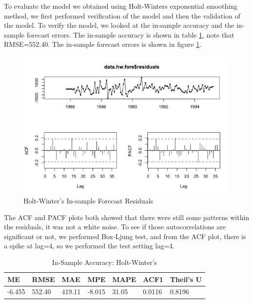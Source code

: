 \documentclass[journal, a4paper]{IEEEtran}
\begin{document}
To evaluate the model we obtained using Holt-Winters exponential smoothing method, we first performed verification of the model and then the validation of the model. 
To verify the model, we looked at the in-sample accuracy and the in-sample forecast errors. The in-sample accuracy is shown in table \ref{table:accuracy}, note that RMSE=552.40.
The in-sample forecast errors is shown in figure \ref{fig1:HW_forecast}.

\begin{figure}[H]
\begin{center}
\includegraphics[scale=0.35]{fig1/HW_forecast_tsdisplay.png}
\caption{Holt-Winter's In-sample Forecast Residuals}
\label{fig1:HW_forecast}
\end{center}
\end{figure}

The ACF and PACF plots both showed that there were still some patterns within the residuals, it was not a white noise.  To see if those autocorrelations are significant or not, we performed Box-Ljung test, and from the ACF plot, there is a spike at lag=4, so we performed the test setting lag=4.


 \begin{table}[H]
 \caption{In-Sample Accuracy: Holt-Winter's}
 \label{table:accuracy}
\centering
 \begin{tabular}{|p{0.75cm}|p{0.75cm}|p{0.75cm}|p{0.75cm}|p{0.75cm}|p{0.75cm}|p{1.2cm}|}
 \hline
 ME     &  RMSE      &  MAE      &   MPE    &   MAPE   &      ACF1  & Theil's U  \\ \hline
 -6.455  & 552.40  & 419.11  & -8.015  & 31.05 & 0.0116  & 0.8196         \\
 \hline
 \end{tabular}
 \end{table}
 
\end{document}

